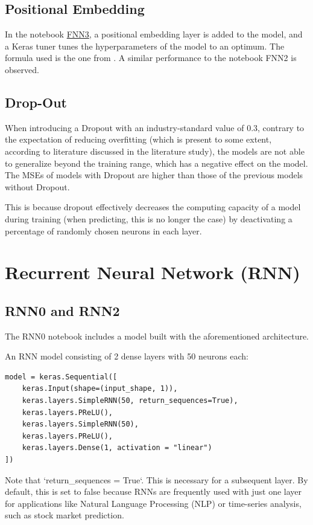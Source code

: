 \documentclass{article}
\begin{document}
\subsection{Positional Embedding}

In the notebook \href{https://github.com/AntonStantan/matura/blob/main/FNN/FNN3.ipynb}{FNN3}, a positional embedding layer is added to the model, and a Keras tuner tunes the hyperparameters of the model to an optimum. The formula used is the one from \cite{vaswani2023attentionneed}. A similar performance to the notebook FNN2 is observed.


\subsection{Drop-Out}
When introducing a Dropout with an industry-standard value of 0.3, contrary to the expectation of reducing overfitting (which is present to some extent, according to literature discussed in the literature study), the models are not able to generalize beyond the training range, which has a negative effect on the model. The MSEs of models with Dropout are higher than those of the previous models without Dropout.

This is because dropout effectively decreases the computing capacity of a model during training (when predicting, this is no longer the case) by deactivating a percentage of randomly chosen neurons in each layer.

\section{Recurrent Neural Network (RNN)}

\subsection{RNN0 and RNN2}
The RNN0 notebook includes a model built with the aforementioned architecture.

An RNN model consisting of 2 dense layers with 50 neurons each:

\begin{Verbatim}
model = keras.Sequential([
    keras.Input(shape=(input_shape, 1)),
    keras.layers.SimpleRNN(50, return_sequences=True),
    keras.layers.PReLU(),
    keras.layers.SimpleRNN(50),
    keras.layers.PReLU(),
    keras.layers.Dense(1, activation = "linear")
])
\end{Verbatim}
Note that `return\_sequences = True`. This is necessary for a subsequent layer. By default, this is set to false because RNNs are frequently used with just one layer for applications like Natural Language Processing (NLP) or time-series analysis, such as stock market prediction.
\end{document}
